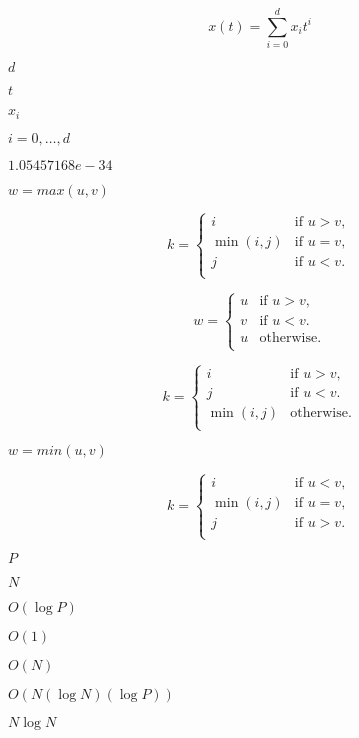 \documentclass{article}
\begin{document}
\[ x(t) = \sum_{i=0}^d x_i t^i \]
\pagebreak

$d$
\pagebreak

$t$
\pagebreak

$x_i$
\pagebreak

$i=0,\dots,d$
\pagebreak

$1.05457168e-34$
\pagebreak

$w = max(u,v)$
\pagebreak

\[ k = \begin{cases} i & \text{if $u > v$}, \\ \min(i,j) & \text{if $u = v$}, \\ j & \text{if $u < v$}. \\ \end{cases} \]
\pagebreak

\[ w = \begin{cases} u & \text{if $u > v$}, \\ v & \text{if $u < v$}. \\ u & \text{otherwise}. \\ \end{cases} \]
\pagebreak

\[ k = \begin{cases} i & \text{if $u > v$}, \\ j & \text{if $u < v$}. \\ \min(i,j) & \text{otherwise}. \\ \end{cases} \]
\pagebreak

$w = min(u,v)$
\pagebreak

\[ k = \begin{cases} i & \text{if $u < v$}, \\ \min(i,j) & \text{if $u = v$}, \\ j & \text{if $u > v$}. \\ \end{cases} \]
\pagebreak

$P$
\pagebreak

$N$
\pagebreak

$O(\log P)$
\pagebreak

$O(1)$
\pagebreak

$O(N)$
\pagebreak

$O(N (\log N) (\log P))$
\pagebreak

$N \log N$
\pagebreak
\end{document}
